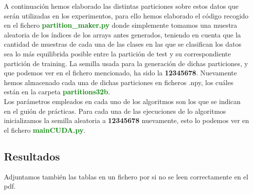 \documentclass[10pt,a4paper]{article}
\begin{document}
A continuación hemos elaborado las distintas particiones sobre estos datos que serán utilizadas en los experimentos, para ello hemos elaborado el código recogido en el fichero \textbf{\textcolor{green}{partition\_maker.py}} donde simplemente tomamos una muestra aleatoria de los índices de los arrays antes generados, teniendo en cuenta que la cantidad de muestras de cada una de las clases en las que se clasifican los datos sea lo más equilibrida posible entre la partición de test y su correspondiente partición de training. La semilla usada para la generación de dichas particiones, y que podemos ver en el fichero mencionado, ha sido la \textbf{12345678}. Nuevamente hemos almacenado cada una de dichas particiones en ficheros .npy, los cuáles están en la carpeta \textbf{\textcolor{green}{partitions32b}}.\\

Los parámetros empleados en cada uno de los algoritmos son los que se indican en el guión de prácticas. Para cada una de las ejecuciones de lo algoritmos inicializamos la semilla aleatoria a \textbf{12345678} nuevamente, esto lo podemos ver en el fichero \textbf{\textcolor{green}{mainCUDA.py}}.\\


\subsection{\color[rgb]{0.0,0.0,0.51}Resultados}

Adjuntamos también las tablas en un fichero por si no se leen correctamente en el pdf.
\end{document}
